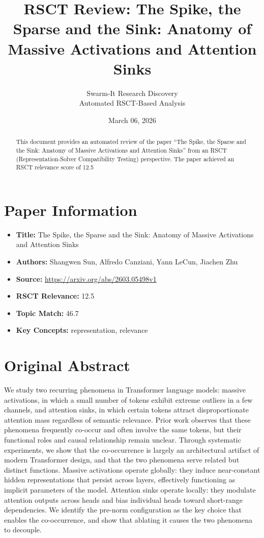 \documentclass[11pt,a4paper]{article}
\title{RSCT Review: The Spike, the Sparse and the Sink: Anatomy of Massive Activations and Attention Sinks}
\author{Swarm-It Research Discovery\\\small Automated RSCT-Based Analysis}
\date{March 06, 2026}
\begin{document}
\maketitle

\begin{abstract}
This document provides an automated review of the paper ``The Spike, the Sparse and the Sink: Anatomy of Massive Activations and Attention Sinks'' from an RSCT (Representation-Solver Compatibility Testing) perspective. The paper achieved an RSCT relevance score of 12.5%
\end{abstract}

\section{Paper Information}
\begin{itemize}
\item \textbf{Title:} The Spike, the Sparse and the Sink: Anatomy of Massive Activations and Attention Sinks
\item \textbf{Authors:} Shangwen Sun, Alfredo Canziani, Yann LeCun, Jiachen Zhu
\item \textbf{Source:} \url{https://arxiv.org/abs/2603.05498v1}
\item \textbf{RSCT Relevance:} 12.5%
\item \textbf{Topic Match:} 46.7%
\item \textbf{Key Concepts:} representation, relevance
\end{itemize}

\section{Original Abstract}
We study two recurring phenomena in Transformer language models: massive activations, in which a small number of tokens exhibit extreme outliers in a few channels, and attention sinks, in which certain tokens attract disproportionate attention mass regardless of semantic relevance. Prior work observes that these phenomena frequently co-occur and often involve the same tokens, but their functional roles and causal relationship remain unclear. Through systematic experiments, we show that the co-occurrence is largely an architectural artifact of modern Transformer design, and that the two phenomena serve related but distinct functions. Massive activations operate globally: they induce near-constant hidden representations that persist across layers, effectively functioning as implicit parameters of the model. Attention sinks operate locally: they modulate attention outputs across heads and bias individual heads toward short-range dependencies. We identify the pre-norm configuration as the key choice that enables the co-occurrence, and show that ablating it causes the two phenomena to decouple.
\end{document}
